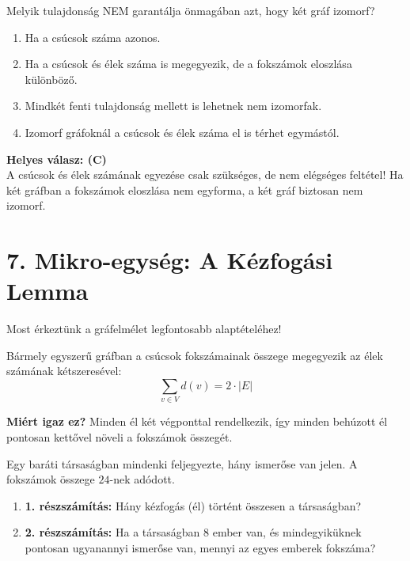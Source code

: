 \documentclass[a4paper,12pt]{article}
\begin{document}
\begin{feladatdoboz}
Melyik tulajdonság NEM garantálja önmagában azt, hogy két gráf izomorf?
\begin{enumerate}[label=(\Alph*)]
    \item Ha a csúcsok száma azonos.
    \item Ha a csúcsok és élek száma is megegyezik, de a fokszámok eloszlása különböző.
    \item Mindkét fenti tulajdonság mellett is lehetnek nem izomorfak.
    \item Izomorf gráfoknál a csúcsok és élek száma el is térhet egymástól.
\end{enumerate}
\end{feladatdoboz}

\begin{megoldasdoboz}
\textbf{Helyes válasz: (C)} \\
A csúcsok és élek számának egyezése csak szükséges, de nem elégséges feltétel! Ha két gráfban a fokszámok eloszlása nem egyforma, a két gráf biztosan nem izomorf.
\end{megoldasdoboz}

\vspace{0.4cm}
\section{7. Mikro-egység: A Kézfogási Lemma}

Most érkeztünk a gráfelmélet legfontosabb alaptételéhez!

\begin{teteldoboz}
Bármely egyszerű gráfban a csúcsok fokszámainak összege megegyezik az élek számának kétszeresével:
\begin{equation}
    \sum_{v \in V} d(v) = 2 \cdot |E|
\end{equation}
\end{teteldoboz}

\textbf{Miért igaz ez?} Minden él két végponttal rendelkezik, így minden behúzott él pontosan kettővel növeli a fokszámok összegét.

\begin{feladatdoboz}
Egy baráti társaságban mindenki feljegyezte, hány ismerőse van jelen. A fokszámok összege $24$-nek adódott.
\begin{enumerate}[label=\alph*)]
    \item \textbf{1. részszámítás:} Hány kézfogás (él) történt összesen a társaságban?
    \item \textbf{2. részszámítás:} Ha a társaságban 8 ember van, és mindegyiküknek pontosan ugyanannyi ismerőse van, mennyi az egyes emberek fokszáma?
\end{enumerate}
\end{feladatdoboz}
\end{document}
